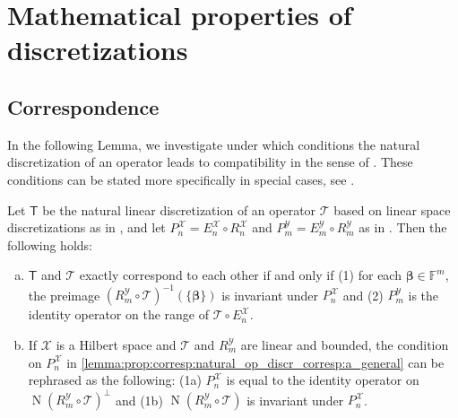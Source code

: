 \documentclass[a4paper]{paper}
\newcommand{\Spc}[1]{\mathscr{#1}}
\newcommand{\Field}{\mathbb{F}}
\newcommand{\Op}[1]{\mathcal{#1}}
\newcommand{\DiscOp}[1]{\mathsf{#1}}
\newcommand*{\EXT}[2]{\ensuremath{E_{#1}^{#2}}}
\newcommand*{\REST}[2]{\ensuremath{R_{#1}^{#2}}}
\newcommand*{\PROJ}[2]{\ensuremath{P_{#1}^{#2}}}
\newcommand*{\RnX}{\ensuremath{\REST{n}{\Spc{X}}}}
\newcommand*{\RmY}{\ensuremath{\REST{m}{\Spc{Y}}}}
\newcommand*{\EnX}{\ensuremath{\EXT{n}{\Spc{X}}}}
\newcommand*{\EmY}{\ensuremath{\EXT{m}{\Spc{Y}}}}
\newcommand*{\PnX}{\ensuremath{\PROJ{n}{\Spc{X}}}}
\newcommand*{\PmY}{\ensuremath{\PROJ{m}{\Spc{Y}}}}
\DeclareMathOperator{\nullspace}{N}
\newcommand{\vbeta}{\boldsymbol{\beta}}
\begin{document}
\section{Mathematical properties of discretizations}
\label{sec:prop}



\subsection{Correspondence}
\label{subsec:prop:corresp}

In the following Lemma, we investigate under which conditions the natural discretization of an operator leads to 
compatibility in the sense of . These conditions can be stated more 
specifically in special cases, see .


\begin{lemma}
 \label{lemma:prop:corresp:natural_op_discr_corresp}
 Let $\DiscOp{T}$ be the natural linear discretization of an operator $\Op{T}$ based on linear space discretizations as 
 in , and let $\PnX = \EnX \circ \RnX$ and $\PmY = \EmY \circ \RmY$ as in 
 . Then the following holds:
 
 \begin{enumerate}[(a)]
  \item \label{lemma:prop:corresp:natural_op_discr_corresp:a_general}
  $\DiscOp{T}$ and $\Op{T}$ exactly correspond to each other if and only if (1) for each $\vbeta \in \Field^m$, the 
  preimage $(\RmY \circ \Op{T})^{-1}(\{\vbeta\})$ is invariant under $\PnX$ and (2) $\PmY$ is the identity operator on 
  the range of $\Op{T} \circ \EnX$.

  \item \label{lemma:prop:corresp:natural_op_discr_corresp:b_hilbert_linear}
  If $\Spc{X}$ is a Hilbert space and $\Op{T}$ and $\RmY$ are linear and bounded, the condition on $\PnX$ in 
  \eqref{lemma:prop:corresp:natural_op_discr_corresp:a_general} can be rephrased as the following: 
  (1a) $\PnX$ is equal to the identity operator on $\nullspace(\RmY \circ \Op{T})^\perp$ and (1b) 
  $\nullspace(\RmY \circ \Op{T})$ is invariant under $\PnX$.
  
 \end{enumerate}
\end{lemma}
\vspace{1em}
\end{document}
